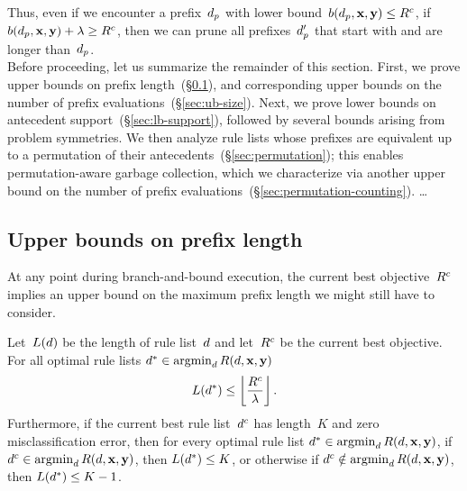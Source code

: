 Thus, even if we encounter a prefix~$d_p$
with lower bound~${b(d_p, \mathbf{x}, \mathbf{y}) \le {R^c}}$,
if ${b(d_p, \mathbf{x}, \mathbf{y}) + {\lambda} \ge {R^c}}$, then we can prune
all prefixes~$d_p'$ that start with and are longer than~$d_p$. \\

Before proceeding, let us summarize the remainder of this section.
%
First, we prove upper bounds on prefix
length~(\S\ref{sec:ub-prefix-length}),
and corresponding upper bounds on the number of
prefix evaluations~(\S\ref{sec:ub-size}).
%
Next, we prove lower bounds on antecedent support~(\S\ref{sec:lb-support}),
followed by several bounds arising from problem symmetries.
%
We then analyze rule lists whose prefixes are equivalent up to
a permutation of their antecedents~(\S\ref{sec:permutation});
this enables permutation-aware garbage collection, which we
characterize via another upper bound on the number of prefix evaluations~(\S\ref{sec:permutation-counting}).
%
\dots

\subsection{Upper bounds on prefix length}
\label{sec:ub-prefix-length}

At any point during branch-and-bound execution, the current best objective~${R^c}$
implies an upper bound on the maximum prefix length we might still have to consider.

\begin{theorem}
\label{thm:ub-prefix-length}
Let~$L({d})$ be the length of rule list~${d}$
and let~${R^c}$ be the current best objective.
For all optimal rule lists ${d^* \in \operatorname*{argmin}_{d} R({d}, \mathbf{x}, \mathbf{y})}$
\begin{align}
L(\OptimalRL) \le \left\lfloor \frac{\CurrentObj}{\Reg} \right\rfloor.
\label{eq:max-length}
\end{align}
Furthermore, if the current best rule list~$d^c$
has length~$K$ and zero misclassification error,
then for every optimal rule list
${d^* \in \operatorname*{argmin}_{d} R({d}, \mathbf{x}, \mathbf{y})}$,
if ${d^c \in \operatorname*{argmin}_d R({d}, \mathbf{x}, \mathbf{y})}$,
then ${L(d^*) \le K}$,
or otherwise if ${d^c \notin \operatorname*{argmin}_d R({d}, \mathbf{x}, \mathbf{y})}$,
then ${L(d^*) \le K - 1}$.
\end{theorem}

